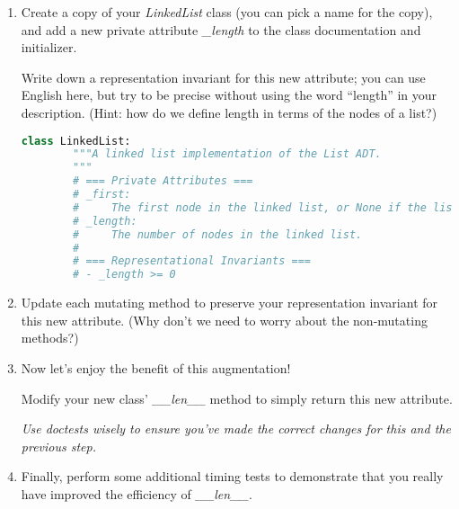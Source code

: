 \documentclass[12pt]{article}
\begin{document}
\begin{enumerate}[1.]
    \item Create a copy of your \textit{LinkedList} class (you can pick a name for the copy),
    and add a new private attribute \textit{\_length} to the class documentation and initializer.

    \bigskip

    Write down a representation invariant for this new attribute; you can use
    English here, but try to be precise without using the word “length” in your
    description. (Hint: how do we define length in terms of the nodes of a list?)

    \bigskip

    \begin{mdframed}
    \begin{lstlisting}[language=python,caption={task\_3\_step\_1\_solution.py}]
    class LinkedList:
        """A linked list implementation of the List ADT.
        """
        # === Private Attributes ===
        # _first:
        #     The first node in the linked list, or None if the list is empty.
        # _length:
        #     The number of nodes in the linked list.
        #
        # === Representational Invariants ===
        # - _length >= 0
    \end{lstlisting}
    \end{mdframed}

    \item Update each mutating method to preserve your representation invariant for this new attribute.
    (Why don’t we need to worry about the non-mutating methods?)

    \item Now let’s enjoy the benefit of this augmentation!

    \bigskip

    Modify your new class’ \textit{\_\_len\_\_} method to simply return this new
    attribute.

    \textit{Use doctests wisely to ensure you’ve made the correct changes for this and the previous step.}

    \item Finally, perform some additional timing tests to demonstrate that you really have
    improved the efficiency of \textit{\_\_len\_\_}.

\end{enumerate}
\end{document}
